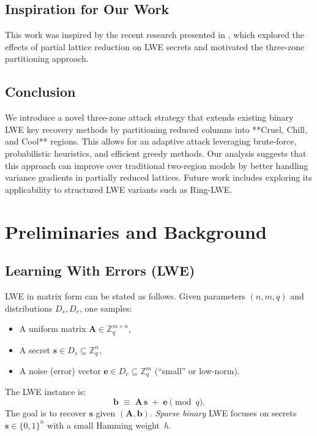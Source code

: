\documentclass[11pt]{article}
\begin{document}
  \subsection{Inspiration for Our Work}
  This work was inspired by the recent research presented in \cite{cool-and-cruel}, which explored the effects of partial lattice reduction on LWE secrets and motivated the three-zone partitioning approach.
  
  \subsection{Conclusion}
  
  We introduce a novel three-zone attack strategy that extends existing binary LWE key recovery methods by partitioning reduced columns into **Cruel, Chill, and Cool** regions. This allows for an adaptive attack leveraging brute-force, probabilistic heuristics, and efficient greedy methods. Our analysis suggests that this approach can improve over traditional two-region models by better handling variance gradients in partially reduced lattices. Future work includes exploring its applicability to structured LWE variants such as Ring-LWE.
  
\section{Preliminaries and Background}
\label{sec:preliminaries}

\subsection{Learning With Errors (LWE)}
\label{subsec:lwe-def}

LWE in matrix form can be stated as follows. 
Given parameters $(n,m,q)$ and distributions $D_s,D_e$, one samples:
\begin{itemize}
    \item A uniform matrix $\mathbf{A} \in \mathbb{Z}_q^{m \times n}$,
    \item A secret $\mathbf{s} \in D_s \subseteq \mathbb{Z}_q^n$,
    \item A noise (error) vector $\mathbf{e} \in D_e \subseteq \mathbb{Z}_q^m$ (``small'' or low-norm).
\end{itemize}
The LWE instance is:
\[
    \mathbf{b} \;\equiv\; \mathbf{A}\,\mathbf{s} \;+\; \mathbf{e} 
    \pmod{q}.
\]
The goal is to recover $\mathbf{s}$ given $(\mathbf{A},\mathbf{b})$. 
\emph{Sparse binary} LWE focuses on secrets $\mathbf{s}\in\{0,1\}^n$ with a small Hamming weight~$h$.
\end{document}

